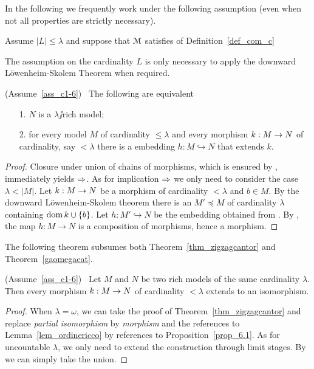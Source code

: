 \documentclass[creche.tex]{subfiles}
\begin{document}
In the following we frequently work under the following assumption (even when not all properties are strictly necessary).
 
\begin{assumption}\label{ass_c1-6}
Assume  $|L|\le\lambda$ and suppose that $\EuScript M$ satisfies  of Definition~\ref{def_com_c}
\end{assumption} 
 
The assumption on the cardinality $L$ is only necessary to apply the downward L\"owenheim-Skolem Theorem when required.

\begin{proposition}\label{prop_6.1}
(Assume~\ref{ass_c1-6})  \  The following are equivalent
\begin{itemize}
\item[1.] $N$ is a $\lambda\jj$rich model;
\item[2.] for every model $M$ of cardinality $\le\lambda$ and every morphism $k:M\rightarrow N$ of cardinality, say $<\lambda$ there is a embedding $h:M\hookrightarrow N$ that extends $k$.
\end{itemize}
\end{proposition}
\begin{proof}
Closure under union of chains of morphisms, which is ensured by , immediately yields $\Rightarrow$.
As for implication $\Rightarrow$ we only need to consider the case $\lambda<|M|$.
Let $k:M\rightarrow N$ be a morphism of cardinality $<\lambda$ and $b\in M$.
By the downward L\"owenheim-Skolem theorem there is an  $M'\preceq M$ of cardinality $\lambda$ containing $\mathop{\rm dom} k \cup\{b\}$.
Let $h:M'\hookrightarrow N$ be the embedding obtained from .
By , the map  $h:M\to N$ is a composition of morphisms, hence a morphism.
\end{proof}

The following theorem subsumes both Theorem~\ref{thm_zigzagcantor} and Theorem~\ref{gaomegacat}.

\begin{theorem}\label{thm_riccozigzag}
(Assume~\ref{ass_c1-6})  \  Let $M$ and $N$ be two rich models of the same cardinality $\lambda$.
Then every morphism $k:M\rightarrow N$ of cardinality $<\lambda$ extends to an isomorphism.
\end{theorem}

\begin{proof}
When $\lambda=\omega$, we can take the proof of Theorem~\ref{thm_zigzagcantor} and replace \textit{partial isomorphism\/} by \textit{morphism\/} and the references to Lemma~\ref{lem_ordinericco} by references to Proposition~\ref{prop_6.1}.
As for uncountable $\lambda$, we only need to extend the construction through limit stages.
By  we can simply take the union.
\end{proof}
\end{document}
